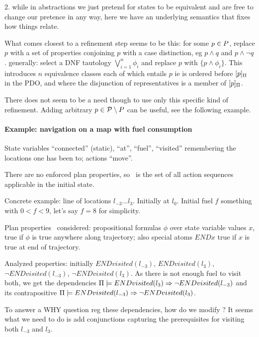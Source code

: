 2. while in abstractions we just pretend for states to be equivalent
and are free to change our pretence in any way, here we have an
underlying semantics that fixes how things relate.

What comes closest to a refinement step seems to be this: for some $p
\in P$, replace $p$ with a set of properties conjoining $p$ with
a case distinction, eg $p \wedge q$ and $p \wedge \neg q$. generally:
select a DNF tautology $\bigvee_{i=1}^n \phi_i$ and replace $p$ with
$\{p \wedge \phi_i\}$. This introduces $n$ equivalence classes each of
which entails $p$ ie is ordered before $[p]_{\Pi}$ in the
PDO, and where the disjunction of representatives is a member of
$[p]_{\Pi}$.

There does not seem to be a need though to use only this specific kind
of refinement. Adding arbitrary $p \in {\cal P} \setminus P$
can be useful, see the following example.





\paragraph{Example: navigation on a map with fuel consumption}

State variables ``connected'' (static), ``at'', ``fuel'', ``visited''
remembering the locations one has been to; actions ``move''.

There are no enforced plan properties, so \plans\ is the set of all
action sequences applicable in the initial state.

Concrete example: line of locations $l_{-3} ... l_3$. Initially at
$l_0$. Initial fuel $f$ something with $0 < f < 9$, let's say $f = 8$
for simplicity.

Plan properties \candprops\ considered: propositional formulas $\phi$
over state variable values $x$, true if $\phi$ is true anywhere along
trajectory; also special atoms $END x$ true if $x$ is true at end of
trajectory.

Analyzed properties: initially $END visited(l_{-3})$, $END
visited(l_3)$, $\neg END visited(l_{-3})$, $\neg END visited(l_3)$. As
there is not enough fuel to visit both, we get the dependencies
$\Pi \models END visited(l_{3}) \Rightarrow \neg END visited(l_{-3})$ and
its contrapositive $\Pi \models END visited(l_{-3}) \Rightarrow \neg END
  visited(l_{3})$.

To answer a WHY question reg these dependencies, how do we modify
\props? It seems what we need to do is add conjunctions capturing the
prerequisites for visiting both $l_{-3}$ and $l_3$. 

